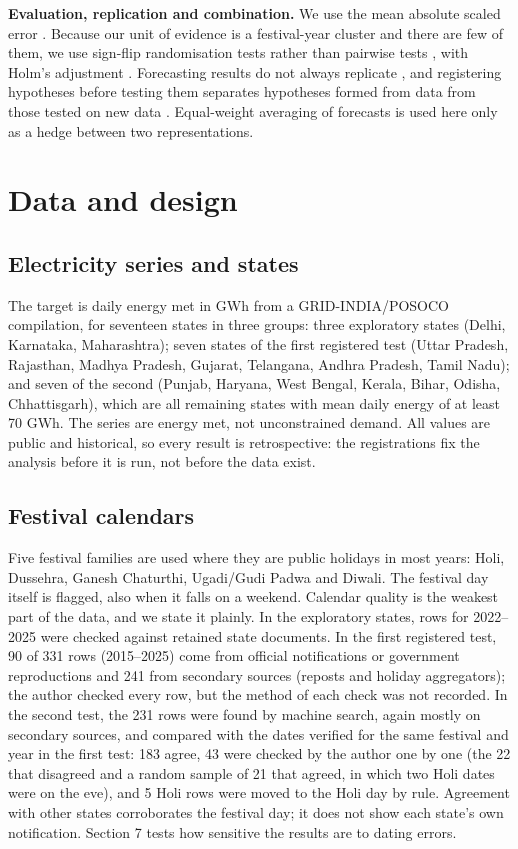 \documentclass[review,12pt,authoryear]{elsarticle}
\begin{document}
\textbf{Evaluation, replication and combination.} We use the mean absolute scaled error \citep{hyndman2006,franses2016}. Because our unit of evidence is a festival-year cluster and there are few of them, we use sign-flip randomisation tests \citep{canay2017,hemerik2020} rather than pairwise tests \citep{diebold1995}, with Holm's adjustment \citep{holm1979}. Forecasting results do not always replicate \citep{boylan2015}, and registering hypotheses before testing them separates hypotheses formed from data from those tested on new data \citep{nosek2018}. Equal-weight averaging of forecasts \citep{bates1969,claeskens2016} is used here only as a hedge between two representations.

\section{Data and design}

\subsection{Electricity series and states}

The target is daily energy met in GWh from a GRID-INDIA/POSOCO compilation, for seventeen states in three groups: three exploratory states (Delhi, Karnataka, Maharashtra); seven states of the first registered test (Uttar Pradesh, Rajasthan, Madhya Pradesh, Gujarat, Telangana, Andhra Pradesh, Tamil Nadu); and seven of the second (Punjab, Haryana, West Bengal, Kerala, Bihar, Odisha, Chhattisgarh), which are all remaining states with mean daily energy of at least 70 GWh. The series are energy met, not unconstrained demand. All values are public and historical, so every result is retrospective: the registrations fix the analysis before it is run, not before the data exist.

\subsection{Festival calendars}

Five festival families are used where they are public holidays in most years: Holi, Dussehra, Ganesh Chaturthi, Ugadi/Gudi Padwa and Diwali. The festival day itself is flagged, also when it falls on a weekend. Calendar quality is the weakest part of the data, and we state it plainly. In the exploratory states, rows for 2022--2025 were checked against retained state documents. In the first registered test, 90 of 331 rows (2015--2025) come from official notifications or government reproductions and 241 from secondary sources (reposts and holiday aggregators); the author checked every row, but the method of each check was not recorded. In the second test, the 231 rows were found by machine search, again mostly on secondary sources, and compared with the dates verified for the same festival and year in the first test: 183 agree, 43 were checked by the author one by one (the 22 that disagreed and a random sample of 21 that agreed, in which two Holi dates were on the eve), and 5 Holi rows were moved to the Holi day by rule. Agreement with other states corroborates the festival day; it does not show each state's own notification. Section 7 tests how sensitive the results are to dating errors.
\end{document}
